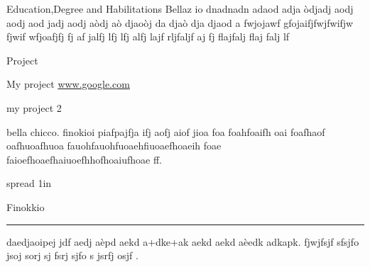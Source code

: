 \documentclass[a4paper,11pt]{dmCV}
\begin{document}
\address{Via Prenestina 226}
\personaldata
\begin{eventlist}{Education,Degree and Habilitations}
  Bellaz io dnadnadn adaod adja òdjadj aodj aodj aod
   jadj aodj aòdj aò djaoòj da djaò dja djaod a
  fwjojawf gfojaifjfwjfwifjw fjwif wfjoafjfj fj af jalfj
    lfj lfj alfj lajf rljfaljf aj fj flajfalj flaj falj lf
\end{eventlist}

\begin{eventlist}{Project}
  \item My project \url{www.google.com}
  \item my project 2
\end{eventlist}

 bella chicco. finokioi piafpajfja ifj aofj aiof jioa foa foahfoaifh
 oai foafhaof oafhuoafhuoa fauohfauohfuoaehfiuoaefhoaeih foae
 faioefhoaefhaiuoefhhofhoaiufhoae ff.\par
\hbox spread 1in{Finokkio  \leaders\hrule  height1.5pt\hfil}
daedjaoipej jdf aedj aèpd aekd a+dke+ak aekd aekd aèedk
adkapk. fjwjfsjf sfsjfo jsoj sorj sj fsrj sjfo s jsrfj osjf .
\end{document}
